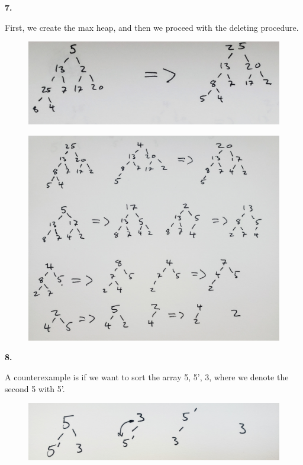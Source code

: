 \documentclass[letterpaper, 11pt]{article}
\newcommand{\hwnumber}[1]{\newpage \noindent\textbf{#1.} \smallskip}
\begin{document}
\hwnumber{7}

First, we create the max heap, and then we proceed with the deleting procedure. 
\begin{figure}[h!]
  \centering
  \includegraphics[width=\linewidth]{pics/num_7_first.jpg}
\end{figure}

\begin{figure}[h!]
  \centering
  \includegraphics[width=\linewidth]{pics/num_7_second.jpg}
\end{figure}

\hwnumber{8}

A counterexample is if we want to sort the array 5, 5', 3, where we denote the
second 5 with 5'. 

\begin{figure}[h!]
  \centering
  \includegraphics[width=\linewidth]{pics/num_8.jpg}
\end{figure}
\end{document}
